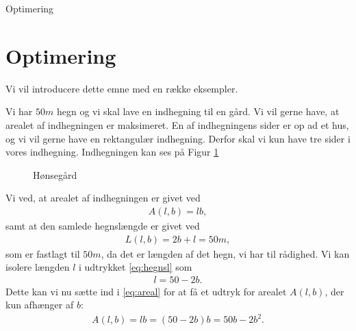 \begin{center}
\Huge
Optimering
\end{center}

\section*{Optimering}

Vi vil introducere dette emne med en række eksempler. 
\begin{exa}
Vi har $50m$ hegn og vi skal lave en indhegning til en gård. Vi vil gerne have, at arealet af indhegningen er maksimeret. En af indhegningens sider er op ad et hus, og vi vil gerne have en rektangulær indhegning. Derfor skal vi kun have tre sider i vores indhegning. Indhegningen kan ses på Figur \ref{fig:indh}
\begin{figure}[H]
\centering
{}
\caption{Hønsegård}
\label{fig:indh}
\end{figure}
Vi ved, at arealet af indhegningen er givet ved 
\begin{align}\label{eq:areal}
A(l,b) = lb,
\end{align}
samt at den samlede hegnslængde er givet ved 
\begin{align}\label{eq:hegnsl}
L(l,b) = 2b+l = 50m,
\end{align}
som er fastlagt til $50m$, da det er længden af det hegn, vi har til rådighed. Vi kan isolere længden $l$ i udtrykket \eqref{eq:hegnsl} som
\begin{align}\label{eq:lsomfb}
l = 50-2b.
\end{align}
Dette kan vi nu sætte ind i \eqref{eq:areal} for at få et udtryk for arealet $A(l,b)$, der kun afhænger af $b$:
\begin{align*}
A(l,b) = lb = (50-2b)b = 50b-2b^2.

\end{align*}
\end{exa}
